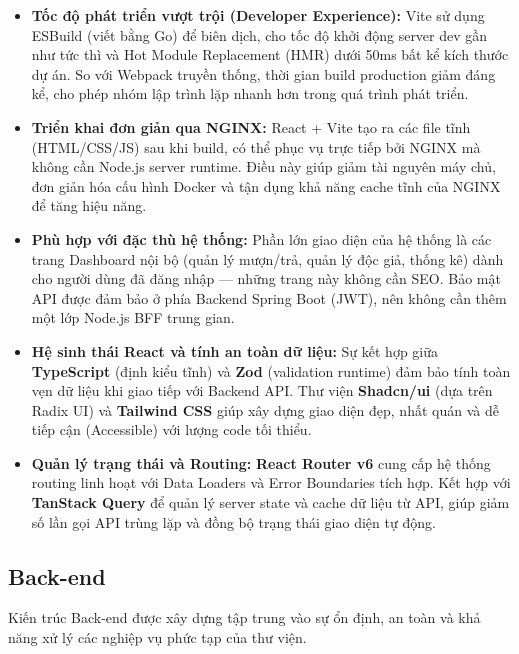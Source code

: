 \begin{itemize}
    \item \textbf{Tốc độ phát triển vượt trội (Developer Experience):}
    Vite sử dụng ESBuild (viết bằng Go) để biên dịch, cho tốc độ khởi động server dev gần như tức thì và Hot Module Replacement (HMR) dưới 50ms bất kể kích thước dự án. So với Webpack truyền thống, thời gian build production giảm đáng kể, cho phép nhóm lập trình lặp nhanh hơn trong quá trình phát triển.

    \item \textbf{Triển khai đơn giản qua NGINX:}
    React + Vite tạo ra các file tĩnh (HTML/CSS/JS) sau khi build, có thể phục vụ trực tiếp bởi NGINX mà không cần Node.js server runtime. Điều này giúp giảm tài nguyên máy chủ, đơn giản hóa cấu hình Docker và tận dụng khả năng cache tĩnh của NGINX để tăng hiệu năng.

    \item \textbf{Phù hợp với đặc thù hệ thống:}
    Phần lớn giao diện của hệ thống là các trang Dashboard nội bộ (quản lý mượn/trả, quản lý độc giả, thống kê) dành cho người dùng đã đăng nhập — những trang này không cần SEO. Bảo mật API được đảm bảo ở phía Backend Spring Boot (JWT), nên không cần thêm một lớp Node.js BFF trung gian.

    \item \textbf{Hệ sinh thái React và tính an toàn dữ liệu:}
    Sự kết hợp giữa \textbf{TypeScript} (định kiểu tĩnh) và \textbf{Zod} (validation runtime) đảm bảo tính toàn vẹn dữ liệu khi giao tiếp với Backend API. Thư viện \textbf{Shadcn/ui} (dựa trên Radix UI) và \textbf{Tailwind CSS} giúp xây dựng giao diện đẹp, nhất quán và dễ tiếp cận (Accessible) với lượng code tối thiểu.

    \item \textbf{Quản lý trạng thái và Routing:}
    \textbf{React Router v6} cung cấp hệ thống routing linh hoạt với Data Loaders và Error Boundaries tích hợp. Kết hợp với \textbf{TanStack Query} để quản lý server state và cache dữ liệu từ API, giúp giảm số lần gọi API trùng lặp và đồng bộ trạng thái giao diện tự động.
\end{itemize}


\subsection{Back-end}
\label{subsec:backend_solution}

Kiến trúc Back-end được xây dựng tập trung vào sự ổn định, an toàn và khả năng xử lý các nghiệp vụ phức tạp của thư viện.


